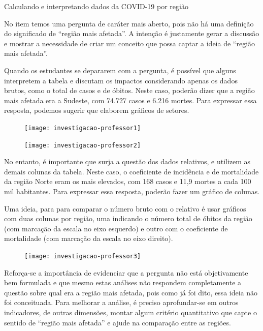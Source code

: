 \begin{answer}{Calculando e interpretando dados da COVID-19 por região}
{
  No item  temos uma pergunta de caráter mais aberto, pois não há uma definição do significado de “região mais afetada”. A intenção é justamente gerar a discussão e mostrar a necessidade de criar um conceito que possa captar a ideia de “região mais afetada”.

  Quando os estudantes se depararem com a pergunta, é possível que alguns interpretem a tabela e discutam os impactos considerando apenas os dados brutos, como o total de casos e de óbitos. Neste caso, poderão dizer que a região mais afetada era a Sudeste, com 74.727 casos e 6.216 mortes. Para expressar essa resposta, podemos sugerir que elaborem gráficos de setores.

  \begin{figure}[H]
  \centering

  \texttt{[image: investigacao-professor1]}

  \texttt{[image: investigacao-professor2]}
  \end{figure}

  No entanto, é importante que surja a questão dos dados relativos, e utilizem as demais colunas da tabela. Neste caso, o coeficiente de incidência e de mortalidade da região Norte eram os mais elevados, com 168 casos e 11,9 mortes a cada 100 mil habitantes. Para expressar essa resposta, poderão fazer um gráfico de colunas.

  Uma ideia, para para comparar o número bruto com o relativo é usar gráficos com duas colunas por região, uma indicando o número total de óbitos da região (com marcação da escala no eixo esquerdo) e outro com o coeficiente de mortalidade (com marcação da escala no eixo direito).

  \begin{figure}[H]
  \centering

  \texttt{[image: investigacao-professor3]}
  \end{figure}

  Reforça-se a importância de evidenciar que a pergunta não está objetivamente bem formulada e que mesmo estas análises não respondem completamente a questão sobre qual era a região mais afetada, pois como já foi dito, essa ideia não foi conceituada. Para melhorar a análise, é preciso aprofundar-se em outros indicadores, de outras dimensões, montar algum critério quantitativo que capte o sentido de “região mais afetada” e ajude na comparação entre as regiões.

}
\end{answer}
